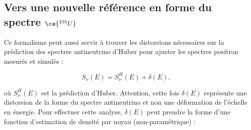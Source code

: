 \bigbreak

%
%
%


\bigbreak

\subsection{Vers une nouvelle référence en forme du spectre $\ce{^{235}U}$}

Ce formalisme peut aussi servir à trouver les distorsions nécessaires sur la prédiction des spectres antineutrino d'Huber pour ajuster les spectres positron mesurés et simulés :

\begin{equation}
    S_{\nu}(E) = S^{H}_{\nu}(E) + \delta(E),
\end{equation}

\bigbreak

où $S^{H}_{\nu}(E)$ est la prédiction d'Huber. Attention, cette fois $\delta(E)$ représente une distorsion de la forme du spectre antineutrino et non une déformation de l'échelle en énergie. Pour effectuer cette analyse, $\delta(E)$ peut prendre la forme d'une fonction d'estimation de densité par noyau (non-paramétrique) : 

